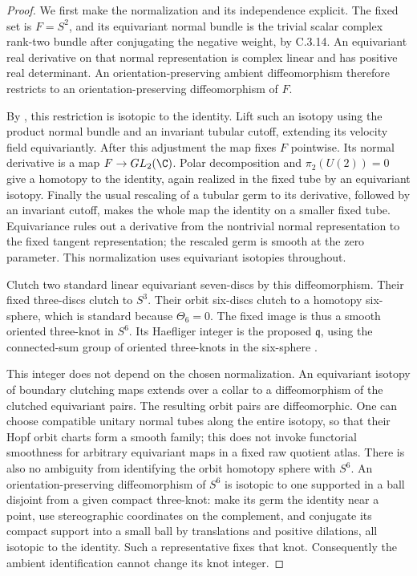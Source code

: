 \begin{proof}
We first make the normalization and its independence explicit.
The fixed set is $F=S^2$, and its equivariant normal bundle is
the trivial scalar complex rank-two bundle after conjugating
the negative weight, by C.3.14. An equivariant real derivative
on that normal representation is complex linear and has
positive real determinant. An orientation-preserving ambient
diffeomorphism therefore restricts to an orientation-preserving
diffeomorphism of $F$.

By \citet[Theorem A, page 621]{Smale1959E}, this restriction is
isotopic to the identity. Lift such an isotopy using the product
normal bundle and an invariant tubular cutoff, extending its
velocity field equivariantly. After this adjustment the map
fixes $F$ pointwise. Its normal derivative is a map
$F\to GL_2(\C)$. Polar decomposition and $\pi_2(U(2))=0$
give a homotopy to the identity, again realized in the fixed
tube by an equivariant isotopy. Finally the usual rescaling
of a tubular germ to its derivative, followed by an invariant
cutoff, makes the whole map the identity on a smaller fixed
tube. Equivariance rules out a derivative from the nontrivial
normal representation to the fixed tangent representation;
the rescaled germ is smooth at the zero parameter. This
normalization uses equivariant isotopies throughout.

Clutch two standard linear equivariant seven-discs by this
diffeomorphism. Their fixed three-discs clutch to $S^3$.
Their orbit six-discs clutch to a homotopy six-sphere, which
is standard because $\Theta_6=0$. The fixed image is thus a
smooth oriented three-knot in $S^6$. Its Haefliger integer is
the proposed $\mathfrak q$, using the connected-sum group of
oriented three-knots in the six-sphere
\citep[Sections 1 and 5.16]{Haefliger1966D}.

This integer does not depend on the chosen normalization.
An equivariant isotopy of boundary clutching maps extends
over a collar to a diffeomorphism of the clutched equivariant
pairs. The resulting orbit pairs are diffeomorphic. One can
choose compatible unitary normal tubes along the entire
isotopy, so that their Hopf orbit charts form a smooth family;
this does not invoke functorial smoothness for arbitrary
equivariant maps in a fixed raw quotient atlas.
There is also no ambiguity from identifying the orbit homotopy
sphere with $S^6$. An orientation-preserving diffeomorphism of
$S^6$ is isotopic to one supported in a ball disjoint from a
given compact three-knot: make its germ the identity near a
point, use stereographic coordinates on the complement, and
conjugate its compact support into a small ball by translations
and positive dilations, all isotopic to the identity. Such a
representative fixes that knot. Consequently the ambient
identification cannot change its knot integer.


\end{proof}
